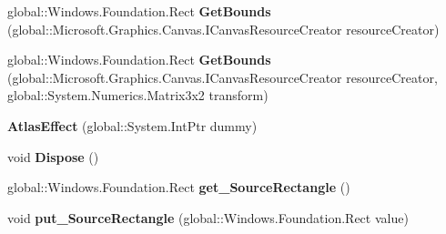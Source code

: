 \begin{DoxyCompactItemize}
\item 
\mbox{\label{class_microsoft_1_1_graphics_1_1_canvas_1_1_effects_1_1_atlas_effect_aa4b944d340dc47c1e8de93692bf057fb}} 
global\+::\+Windows.\+Foundation.\+Rect {\bfseries Get\+Bounds} (global\+::\+Microsoft.\+Graphics.\+Canvas.\+I\+Canvas\+Resource\+Creator resource\+Creator)
\item 
\mbox{\label{class_microsoft_1_1_graphics_1_1_canvas_1_1_effects_1_1_atlas_effect_af407ba20dad039a6d8dbb231b3b3718d}} 
global\+::\+Windows.\+Foundation.\+Rect {\bfseries Get\+Bounds} (global\+::\+Microsoft.\+Graphics.\+Canvas.\+I\+Canvas\+Resource\+Creator resource\+Creator, global\+::\+System.\+Numerics.\+Matrix3x2 transform)
\item 
\mbox{\label{class_microsoft_1_1_graphics_1_1_canvas_1_1_effects_1_1_atlas_effect_a9224bd02ca7d3b31765c8f85e77066bd}} 
{\bfseries Atlas\+Effect} (global\+::\+System.\+Int\+Ptr dummy)
\item 
\mbox{\label{class_microsoft_1_1_graphics_1_1_canvas_1_1_effects_1_1_atlas_effect_a565fbf00024f2bc49eda0142d8328107}} 
void {\bfseries Dispose} ()
\item 
\mbox{\label{class_microsoft_1_1_graphics_1_1_canvas_1_1_effects_1_1_atlas_effect_aef2eff3d4b0a6e08db65a1ec2b79dd7c}} 
global\+::\+Windows.\+Foundation.\+Rect {\bfseries get\+\_\+\+Source\+Rectangle} ()
\item 
\mbox{\label{class_microsoft_1_1_graphics_1_1_canvas_1_1_effects_1_1_atlas_effect_a5b0831a587ccba8f8446c7c800898567}} 
void {\bfseries put\+\_\+\+Source\+Rectangle} (global\+::\+Windows.\+Foundation.\+Rect value)
\item 
\mbox{\label{class_microsoft_1_1_graphics_1_1_canvas_1_1_effects_1_1_atlas_effect_a7e457bab07ec38167bce72c522e34743}} 

\end{DoxyCompactItemize}
